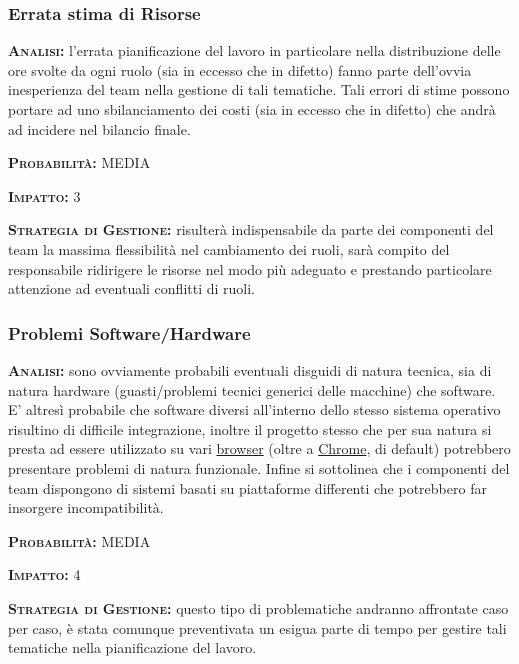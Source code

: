 \subsubsection{Errata stima di Risorse}
\begin{description}
	\item{\scshape\bfseries Analisi:} l'errata pianificazione del lavoro in particolare nella distribuzione delle ore svolte da ogni ruolo (sia in eccesso che in difetto) fanno parte dell'ovvia inesperienza del team nella gestione di tali tematiche. Tali errori di stime possono portare ad uno sbilanciamento dei costi (sia in eccesso che in difetto) che andrà ad incidere nel bilancio finale.
	\item{\scshape\bfseries Probabilità:} MEDIA
	\item{\scshape\bfseries Impatto:} 3
	\item{\scshape\bfseries Strategia di Gestione:} risulterà indispensabile da parte dei componenti del team la massima flessibilità nel cambiamento dei ruoli, sarà compito del responsabile ridirigere le risorse nel modo più adeguato e prestando particolare attenzione ad eventuali conflitti di ruoli.
\end{description}

\subsubsection{Problemi Software/Hardware}
\begin{description}
	\item{\scshape\bfseries Analisi:} sono ovviamente probabili eventuali disguidi di natura tecnica, sia di natura hardware (guasti/problemi tecnici generici delle macchine) che software. E' altresì probabile che software diversi all'interno dello stesso sistema operativo risultino di difficile integrazione, inoltre il progetto stesso che per sua natura si presta ad essere utilizzato su vari \underline{browser} (oltre a \underline{Chrome}, di default) potrebbero presentare problemi di natura funzionale. Infine si sottolinea che i componenti del team dispongono di sistemi basati su piattaforme differenti che potrebbero far insorgere incompatibilità.
	\item{\scshape\bfseries Probabilità:} MEDIA
	\item{\scshape\bfseries Impatto:} 4
	\item{\scshape\bfseries Strategia di Gestione:} questo tipo di problematiche andranno affrontate caso per caso, è stata comunque preventivata un esigua parte di tempo per gestire tali tematiche nella pianificazione del lavoro.
\end{description}



